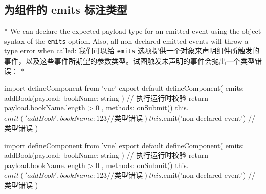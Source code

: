 \begin{paracol}{2}
\subsection{为组件的 emits 标注类型}
\switchcolumn[0]*%
We can declare the expected payload type for an emitted event using the
object syntax of the \texttt{emits} option. Also, all non-declared
emitted events will throw a type error when called:
\switchcolumn
我们可以给 \texttt{emits}
选项提供一个对象来声明组件所触发的事件，以及这些事件所期望的参数类型。试图触发未声明的事件会抛出一个类型错误：
\switchcolumn[0]*%
\begin{codeTs}
import { defineComponent } from 'vue'
export default defineComponent({
  emits: {
    addBook(payload: { bookName: string }) {
      // 执行运行时校验
      return payload.bookName.length > 0
    }
  },
  methods: {
    onSubmit() {
      this.$emit('addBook', {
        bookName: 123 // 类型错误
      })
      this.$emit('non-declared-event') // 类型错误
    }
  }
})
\end{codeTs}
\switchcolumn
\begin{codeTs}
import { defineComponent } from 'vue'
export default defineComponent({
  emits: {
    addBook(payload: { bookName: string }) {
      // 执行运行时校验
      return payload.bookName.length > 0
    }
  },
  methods: {
    onSubmit() {
      this.$emit('addBook', {
        bookName: 123 // 类型错误
      })
      this.$emit('non-declared-event') // 类型错误
    }
  }
})
\end{codeTs}
\end{paracol}


